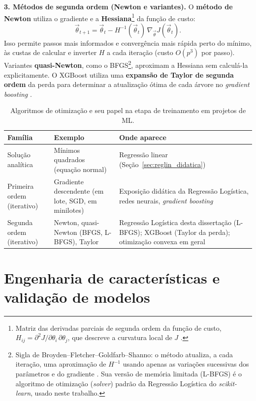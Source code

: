 \textbf{3. Métodos de segunda ordem (Newton e variantes).} O \textbf{método de Newton} utiliza o gradiente e a \textbf{Hessiana}\footnote{Matriz das derivadas parciais de segunda ordem da função de custo, $H_{ij} = \partial^2 J / \partial\theta_i\,\partial\theta_j$, que descreve a curvatura local de $J$ \citep{Nocedal2006}.} da função de custo:
\[
\vec{\theta}_{t+1} = \vec{\theta}_t - H^{-1}(\vec{\theta}_t) \, \nabla_{\vec{\theta}} J(\vec{\theta}_t).
\]
Isso permite passos mais informados e convergência mais rápida perto do mínimo, às custas de calcular e inverter \(H\) a cada iteração (custo \(O(p^3)\) por passo). Variantes \textbf{quasi-Newton}, como o BFGS\footnote{Sigla de Broyden--Fletcher--Goldfarb--Shanno: o método atualiza, a cada iteração, uma aproximação de $H^{-1}$ usando apenas as variações sucessivas dos parâmetros e do gradiente \citep[cap.~6]{Nocedal2006}. Sua versão de memória limitada (L-BFGS) é o algoritmo de otimização (\textit{solver}) padrão da Regressão Logística do \textit{scikit-learn}, usado neste trabalho.}, aproximam a Hessiana sem calculá-la explicitamente. O XGBoost utiliza uma \textbf{expansão de Taylor de segunda ordem} da perda para determinar a atualização ótima de cada árvore no \textit{gradient boosting} \citep{geron2019maos}.

\begin{table}[htbp]
\centering
\small
\caption{Algoritmos de otimização e seu papel na etapa de treinamento em projetos de ML.}
\label{tab:otimizacao}
\begin{tabular}{@{}p{3.0cm}p{4.8cm}p{6.2cm}@{}}
\hline
\textbf{Família} & \textbf{Exemplo} & \textbf{Onde aparece} \\
\hline
Solução analítica & Mínimos quadrados (equação normal) & Regressão linear (Seção~\ref{sec:reglin_didatica}) \\
\hline
Primeira ordem (iterativo) & Gradiente descendente (em lote, SGD, em minilotes) & Exposição didática da Regressão Logística, redes neurais, \textit{gradient boosting} \\
\hline
Segunda ordem (iterativo) & Newton, quasi-Newton (BFGS, L-BFGS), Taylor & Regressão Logística desta dissertação (L-BFGS); XGBoost (Taylor da perda); otimização convexa em geral \\
\hline
\end{tabular}
\end{table}

\section{Engenharia de características e validação de modelos}
\label{sec:feature_validacao}

